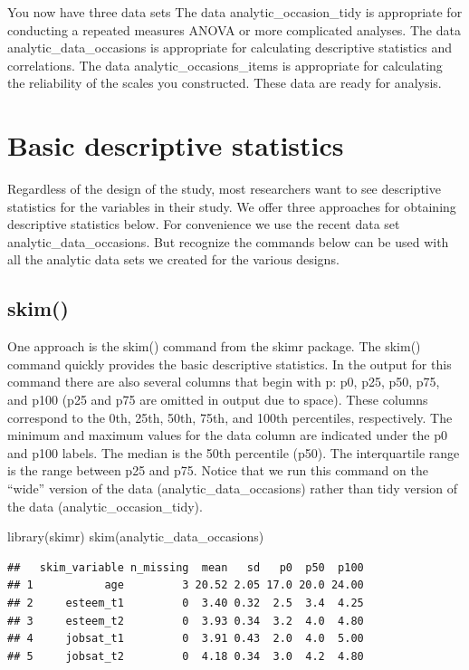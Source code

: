 \documentclass[
]{krantz}
\makeatletter
\newenvironment{Shaded}{\begin{snugshade}}{\end{snugshade}}
\newcommand{\FunctionTok}[1]{\textcolor[rgb]{0,0,0}{#1}}
\newcommand{\NormalTok}[1]{#1}
\newenvironment{kframe}{%
\medskip{}
\setlength{\fboxsep}{.8em}
 \def\at@end@of@kframe{}%
 \ifinner\ifhmode%
  \def\at@end@of@kframe{\end{minipage}}%
  \begin{minipage}{\columnwidth}%
 \fi\fi%
 \def\FrameCommand##1{\hskip\@totalleftmargin \hskip-\fboxsep
 \colorbox{shadecolor}{##1}\hskip-\fboxsep
     \hskip-\linewidth \hskip-\@totalleftmargin \hskip\columnwidth}%
 \MakeFramed {\advance\hsize-\width
   \@totalleftmargin\z@ \linewidth\hsize
   \@setminipage}}%
 {\par\unskip\endMakeFramed%
 \at@end@of@kframe}
\renewenvironment{Shaded}{\begin{kframe}}{\end{kframe}}
\makeatother
\begin{document}
You now have three data sets The data analytic\_occasion\_tidy is appropriate for conducting a repeated measures ANOVA or more complicated analyses. The data analytic\_data\_occasions is appropriate for calculating descriptive statistics and correlations. The data analytic\_occasions\_items is appropriate for calculating the reliability of the scales you constructed. These data are ready for analysis.

\hypertarget{basic-descriptive-statistics}{%
\section{Basic descriptive statistics}\label{basic-descriptive-statistics}}

Regardless of the design of the study, most researchers want to see descriptive statistics for the variables in their study. We offer three approaches for obtaining descriptive statistics below. For convenience we use the recent data set analytic\_data\_occasions. But recognize the commands below can be used with all the analytic data sets we created for the various designs.

\hypertarget{skim}{%
\subsection{skim()}\label{skim}}

One approach is the skim() command from the skimr package. The skim() command quickly provides the basic descriptive statistics. In the output for this command there are also several columns that begin with p: p0, p25, p50, p75, and p100 (p25 and p75 are omitted in output due to space). These columns correspond to the 0th, 25th, 50th, 75th, and 100th percentiles, respectively. The minimum and maximum values for the data column are indicated under the p0 and p100 labels. The median is the 50th percentile (p50). The interquartile range is the range between p25 and p75. Notice that we run this command on the ``wide'' version of the data (analytic\_data\_occasions) rather than tidy version of the data (analytic\_occasion\_tidy).

\begin{Shaded}
\begin{Highlighting}[]
\FunctionTok{library}\NormalTok{(skimr)}
\FunctionTok{skim}\NormalTok{(analytic\_data\_occasions)}
\end{Highlighting}
\end{Shaded}

\begin{verbatim}
##   skim_variable n_missing  mean   sd   p0  p50  p100
## 1           age         3 20.52 2.05 17.0 20.0 24.00
## 2     esteem_t1         0  3.40 0.32  2.5  3.4  4.25
## 3     esteem_t2         0  3.93 0.34  3.2  4.0  4.80
## 4     jobsat_t1         0  3.91 0.43  2.0  4.0  5.00
## 5     jobsat_t2         0  4.18 0.34  3.0  4.2  4.80
\end{verbatim}
\end{document}
